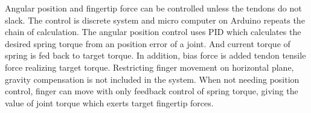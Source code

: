 \documentclass{llncs}
\begin{document}
Angular position and fingertip force can be controlled unless the tendons do not slack.
The control is discrete system and micro computer on Arduino repeats the chain of calculation.
The angular position control uses PID which calculates the desired spring torque from an position error of a joint.
And current torque of spring is fed back to target torque.
In addition, bias force is added tendon tensile force realizing target torque.
Restricting finger movement on horizontal plane, gravity compensation is not included in the system.
When not needing position control, finger can move with only feedback control of spring torque, giving the value of joint torque which exerts target fingertip forces.

\end{document}
